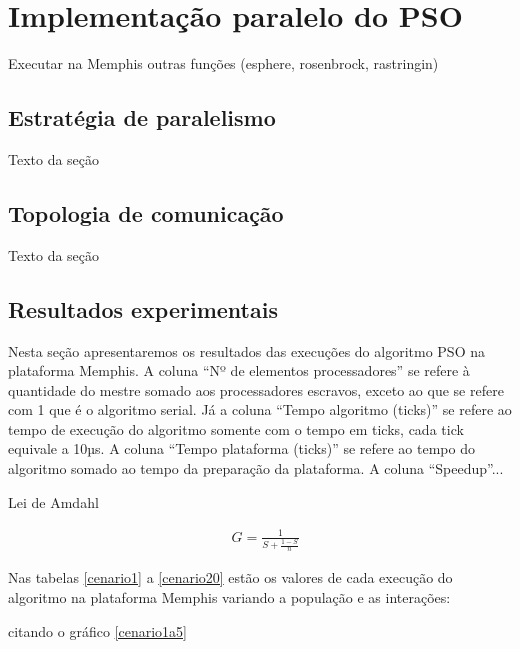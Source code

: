 \chapter{Implementação paralelo do PSO}

Executar na Memphis outras funções (esphere, rosenbrock, rastringin)

\section{Estratégia de paralelismo}

Texto da seção

\section{Topologia de comunicação}

Texto da seção

\section{Resultados experimentais}

Nesta seção apresentaremos os resultados das execuções do algoritmo PSO na plataforma Memphis.
A coluna “Nº de elementos processadores” se refere à quantidade do mestre somado aos processadores escravos, exceto ao que se refere com 1 que é o algoritmo serial. Já a coluna “Tempo algoritmo (ticks)” se refere ao tempo de execução do algoritmo somente com o tempo em ticks, cada tick equivale a 10µs. A coluna “Tempo plataforma (ticks)” se refere ao tempo do algoritmo somado ao tempo da preparação da plataforma. A coluna “Speedup”...

Lei de Amdahl

\begin{align}
    &G=\frac{1}{S+\frac{1-S}{n}}
\end{align}

Nas tabelas \ref{cenario1} a \ref{cenario20} estão os valores de cada execução do algoritmo na plataforma Memphis variando a população e as interações:

citando o gráfico \ref{cenario1a5}

